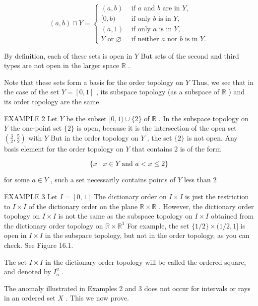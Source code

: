 \[
\left( {a,b}\right)  \cap  Y = \left\{ \begin{array}{ll} \left( {a,b}\right) & \text{ if }a\text{ and }b\text{ are in }Y, \\  \lbrack 0,b) & \text{ if only }b\text{ is in }Y, \\  \left( {a,1}\right) & \text{ if only }a\text{ is in }Y, \\  Y\text{ or }\varnothing & \text{ if neither }a\text{ nor }b\text{ is in }Y. \end{array}\right.
\]

By definition, each of these sets is open in \(Y\) But sets of the second and third types are not open in the larger space \(\mathbb{R}\) .

Note that these sets form a basis for the order topology on \(Y\) Thus, we see that in the case of the set \(Y = \left\lbrack  {0,1}\right\rbrack\) , its subspace topology (as a subspace of \(\mathbb{R}\) ) and its order topology are the same.

EXAMPLE 2 Let \(Y\) be the subset \(\lbrack 0,1) \cup  \{ 2\}\) of \(\mathbb{R}\) . In the subspace topology on \(Y\) the one-point set \(\{ 2\}\) is open, because it is the intersection of the open set \(\left( {\frac{3}{2},\frac{5}{2}}\right)\) with \(Y\) But in the order topology on \(Y\) , the set \(\{ 2\}\) is not open. Any basis element for the order topology on \(Y\) that contains 2 is of the form

\[
\{ x \mid  x \in  Y\text{ and }a < x \leq  2\}
\]

for some \(a \in  Y\) , such a set necessarily contains points of \(Y\) less than 2

EXAMPLE 3 Let \(I = \left\lbrack  {0,1}\right\rbrack\) The dictionary order on \(I \times  I\) is just the restriction to \(I \times  I\) of the dictionary order on the plane \(\mathbb{R} \times  \mathbb{R}\) . However, the dictionary order topology on \(I \times  I\) is not the same as the subspace topology on \(I \times  I\) obtained from the dictionary order topology on \(\mathbb{R} \times  {\mathbb{R}}^{1}\) For example, the set \(\{ 1/2\}  \times  (1/2,1\rbrack\) is open in \(I \times  I\) in the subspace topology, but not in the order topology, as you can check. See Figure 16.1.

The set \(I \times  I\) in the dictionary order topology will be called the ordered square, and denoted by \({I}_{o}^{2}\) .

The anomaly illustrated in Examples 2 and 3 does not occur for intervals or rays in an ordered set \(X\) . This we now prove.

